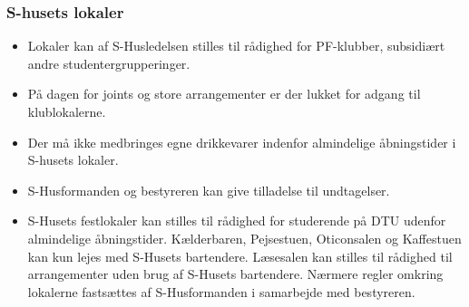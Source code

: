 \subsubsection{S-husets lokaler}
\begin{itemize}
\item Lokaler kan af S-Husledelsen stilles til rådighed for PF-klubber, subsidiært andre studentergrupperinger.
\item På dagen for joints og store arrangementer er der lukket for adgang til klublokalerne.
\item Der må ikke medbringes egne drikkevarer indenfor almindelige åbningstider i S-husets lokaler.
\item S-Husformanden og bestyreren kan give tilladelse til undtagelser.
\item S-Husets festlokaler kan stilles til rådighed for studerende på DTU udenfor almindelige åbningstider. Kælderbaren, Pejsestuen, Oticonsalen og Kaffestuen kan kun lejes med S-Husets bartendere. Læsesalen kan stilles til rådighed til arrangementer uden brug af S-Husets bartendere. Nærmere regler omkring lokalerne fastsættes af S-Husformanden i samarbejde med bestyreren.
\end{itemize}

